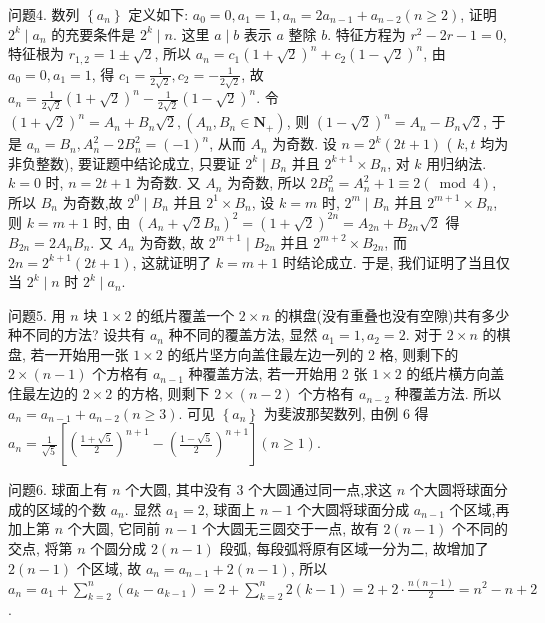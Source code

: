 问题4. 数列 $\left\{a_n\right\}$ 定义如下: $a_0=0, a_1=1, a_n=2 a_{n-1}+a_{n-2}(n \geqslant 2)$, 证明 $2^k \mid a_n$ 的充要条件是 $2^k \mid n$. 这里 $a \mid b$ 表示 $a$ 整除 $b$. 
特征方程为 $r^2-2 r-1=0$, 特征根为 $r_{1,2}=1 \pm \sqrt{2}$, 所以 $a_n= c_1(1+\sqrt{2})^n+c_2(1-\sqrt{2})^n$, 由 $a_0=0, a_1=1$, 得 $c_1=\frac{1}{2 \sqrt{2}}, c_2=-\frac{1}{2 \sqrt{2}}$, 故 $a_n=\frac{1}{2 \sqrt{2}}(1+\sqrt{2})^n-\frac{1}{2 \sqrt{2}}(1-\sqrt{2})^n$. 令 $(1+\sqrt{2})^n=A_n+B_n \sqrt{2},\left(A_n, B_n \in \mathbf{N}_{+}\right)$, 则 $(1-\sqrt{2})^n=A_n-B_n \sqrt{2}$, 于是 $a_n=B_n, A_n^2-2 B_n^2=(-1)^n$, 从而 $A_n$ 为奇数.
设 $n=2^k(2 t+1)$ ( $k, t$ 均为非负整数), 要证题中结论成立, 只要证 $2^k \mid B_n$
并且 $2^{k+1} \times B_n$, 对 $k$ 用归纳法.
$k=0$ 时, $n=2 t+1$ 为奇数.
又 $A_n$ 为奇数, 所以 $2 B_n^2=A_n^2+1 \equiv 2(\bmod 4)$, 所以 $B_n$ 为奇数,故 $2^0 \mid B_n$ 并且 $2^1 \times B_n$, 设 $k=m$ 时, $2^m \mid B_n$ 并且 $2^{m+1} \times B_n$, 则 $k=m+1$ 时, 由 $\left(A_n+\sqrt{2} B_n\right)^2=(1+\sqrt{2})^{2 n}= A_{2 n}+B_{2 n} \sqrt{2}$ 得 $B_{2 n}=2 A_n B_n$. 又 $A_n$ 为奇数, 故 $2^{m+1} \mid B_{2 n}$ 并且 $2^{m+2} \times B_{2 n}$, 而 $2 n=2^{k+1}(2 t+1)$, 这就证明了 $k=m+1$ 时结论成立.
于是, 我们证明了当且仅当 $2^k \mid n$ 时 $2^k \mid a_n$.



问题5. 用 $n$ 块 $1 \times 2$ 的纸片覆盖一个 $2 \times n$ 的棋盘(没有重叠也没有空隙)共有多少种不同的方法?
设共有 $a_n$ 种不同的覆盖方法, 显然 $a_1=1, a_2=2$. 对于 $2 \times n$ 的棋盘, 若一开始用一张 $1 \times 2$ 的纸片坚方向盖住最左边一列的 2 格, 则剩下的 $2 \times (n-1)$ 个方格有 $a_{n-1}$ 种覆盖方法, 若一开始用 2 张 $1 \times 2$ 的纸片横方向盖住最左边的 $2 \times 2$ 的方格, 则剩下 $2 \times(n-2)$ 个方格有 $a_{n-2}$ 种覆盖方法.
所以 $a_n= a_{n-1}+a_{n-2}(n \geqslant 3)$. 可见 $\left\{a_n\right\}$ 为斐波那契数列, 由例 6 得 $a_n= \frac{1}{\sqrt{5}}\left[\left(\frac{1+\sqrt{5}}{2}\right)^{n+1}-\left(\frac{1-\sqrt{5}}{2}\right)^{n+1}\right](n \geqslant 1)$.



问题6. 球面上有 $n$ 个大圆, 其中没有 3 个大圆通过同一点,求这 $n$ 个大圆将球面分成的区域的个数 $a_n$.
显然 $a_1=2$, 球面上 $n-1$ 个大圆将球面分成 $a_{n-1}$ 个区域,再加上第 $n$ 个大圆, 它同前 $n-1$ 个大圆无三圆交于一点, 故有 $2(n-1)$ 个不同的交点, 将第 $n$ 个圆分成 $2(n-1)$ 段弧, 每段弧将原有区域一分为二, 故增加了 $2(n-1)$ 个区域, 故 $a_n=a_{n-1}+2(n-1)$, 所以 $a_n=a_1+\sum_{k=2}^n\left(a_k-a_{k-1}\right)=2+ \sum_{k=2}^n 2(k-1)=2+2 \cdot \frac{n(n-1)}{2}=n^2-n+2$.




